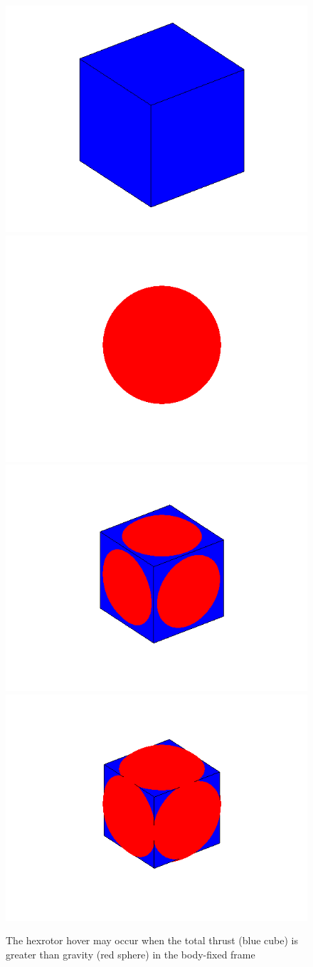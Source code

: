 \documentclass[11pt,professionalfonts,hyperref={pdftex,pdfpagemode=none,pdfstartview=FitH}]{beamer}
\begin{document}
\begin{frame}
{\begin{figure}
\centerline{
	\subfigure
		{\includegraphics[width=0.25\columnwidth]{CompletelyAdmissibleRegions}}
	\subfigure
		{\includegraphics[width=0.25\columnwidth]{CompletelyInadmissibleRegions}}
	\subfigure
		{\includegraphics[width=0.25\columnwidth]{PartiallyAdmissibleRegions_connecting}}
	\subfigure
		{\includegraphics[width=0.25\columnwidth]{PartiallyAdmissibleRegions_notconnecting}}
	}
\vspace*{-0.3cm}
\caption{The hexrotor hover may occur when the total thrust (blue cube) is greater than gravity (red sphere) in the body-fixed frame}
\end{figure}
}
\end{frame}
\end{document}

